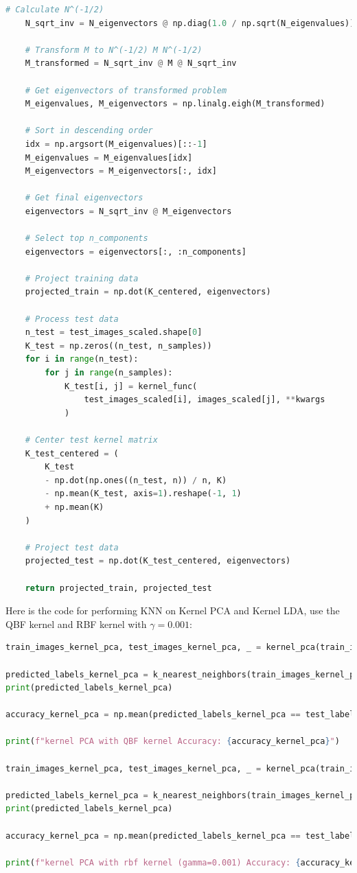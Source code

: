 \documentclass{homework}
\begin{document}
\begin{lstlisting}[language=Python]
    # Calculate N^(-1/2)
    N_sqrt_inv = N_eigenvectors @ np.diag(1.0 / np.sqrt(N_eigenvalues)) @ N_eigenvectors.T

    # Transform M to N^(-1/2) M N^(-1/2)
    M_transformed = N_sqrt_inv @ M @ N_sqrt_inv

    # Get eigenvectors of transformed problem
    M_eigenvalues, M_eigenvectors = np.linalg.eigh(M_transformed)

    # Sort in descending order
    idx = np.argsort(M_eigenvalues)[::-1]
    M_eigenvalues = M_eigenvalues[idx]
    M_eigenvectors = M_eigenvectors[:, idx]

    # Get final eigenvectors
    eigenvectors = N_sqrt_inv @ M_eigenvectors

    # Select top n_components
    eigenvectors = eigenvectors[:, :n_components]

    # Project training data
    projected_train = np.dot(K_centered, eigenvectors)

    # Process test data
    n_test = test_images_scaled.shape[0]
    K_test = np.zeros((n_test, n_samples))
    for i in range(n_test):
        for j in range(n_samples):
            K_test[i, j] = kernel_func(
                test_images_scaled[i], images_scaled[j], **kwargs
            )

    # Center test kernel matrix
    K_test_centered = (
        K_test
        - np.dot(np.ones((n_test, n)) / n, K)
        - np.mean(K_test, axis=1).reshape(-1, 1)
        + np.mean(K)
    )

    # Project test data
    projected_test = np.dot(K_test_centered, eigenvectors)

    return projected_train, projected_test
\end{lstlisting}

Here is the code for performing KNN on Kernel PCA and Kernel LDA, use the QBF kernel and RBF kernel with $\gamma=0.001$:

\begin{lstlisting}[language=Python]
train_images_kernel_pca, test_images_kernel_pca, _ = kernel_pca(train_images, test_images, n_components=135, kernel_func=qbf_kernel)

predicted_labels_kernel_pca = k_nearest_neighbors(train_images_kernel_pca, train_labels, test_images_kernel_pca, k=3)
print(predicted_labels_kernel_pca)

accuracy_kernel_pca = np.mean(predicted_labels_kernel_pca == test_labels)

print(f"kernel PCA with QBF kernel Accuracy: {accuracy_kernel_pca}")

train_images_kernel_pca, test_images_kernel_pca, _ = kernel_pca(train_images, test_images, n_components=135, kernel_func=rbf_kernel, gamma=0.001)

predicted_labels_kernel_pca = k_nearest_neighbors(train_images_kernel_pca, train_labels, test_images_kernel_pca, k=3)
print(predicted_labels_kernel_pca)

accuracy_kernel_pca = np.mean(predicted_labels_kernel_pca == test_labels)

print(f"kernel PCA with rbf kernel (gamma=0.001) Accuracy: {accuracy_kernel_pca}")
\end{lstlisting}
\end{document}

